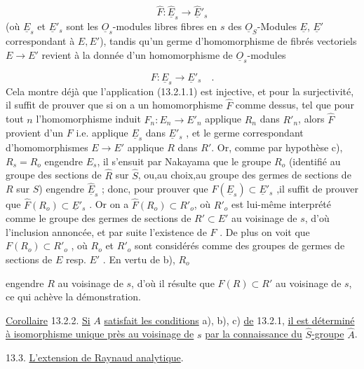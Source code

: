\begin{equation*}
\hat{F} : \hat{\underline{E}}_s \longrightarrow \hat{\underline{E}}'_s
\end{equation*}
(où $\underline{E}_s$ et $\underline{E}'_s$ sont les $\underline{O}_s$-modules libres fibres en $s$ des $\underline{O}_S$-Modules $\underline{E}$, $\underline{E}'$ correspondant à $E,E'$), tandis qu'un germe d'homomorphisme de fibrés vectoriels $E \longrightarrow E'$ revient à la donnée d'un homomorphisme de $\underline{O}_s$-modules

\begin{equation*}
F : \underline{E}_s \longrightarrow \underline{E}'_s \quad .
\end{equation*}
Cela montre déjà que l'application (13.2.1.1) est injective, et pour la surjectivité, il suffit de prouver que si on a un homomorphisme $\hat{F}$ comme dessus, tel que pour tout $n$ l'homomorphisme induit $F_n : E_n \longrightarrow E'_n$ applique $R_n$ dans $R'_n$, alors $\hat{F}$ provient d'un $F$ i.e. applique $\underline{E}_s$ dans $\underline{E}'_s$ , et le germe correspondant d'homomorphismes $E \longrightarrow E'$ applique $R$ dans $R'$. Or, comme par hypothèse c), $R_s = R_o$ engendre $E_s$, il s'ensuit par Nakayama que le groupe $R_o$ (identifié au groupe des sections de $\hat{R}$ sur $\hat{S}$, ou,au choix,au groupe des germes de sections de $R$ sur $S$) engendre $\hat{\underline{E}}_s$ ; donc, pour prouver que $\hat{F}(\underline{E}_s) \subset \underline{E}'_s$ ,il suffit de prouver que $\hat{F}(R_o) \subset \underline{E}'_s$ . Or on a $\hat{F}(R_o) \subset R'_o$, où $R'_o$ est lui-même interprété comme le groupe des germes de sections de $R' \subset E'$ au voisinage de $s$, d'où l'inclusion annoncée, et par suite l'existence de $F$ . De plus on voit que $F(R_o) \subset R'_o$ , où $R_o$ et $R'_o$ sont considérés comme des groupes de germes de sections de $E$ resp. $E'$ . En vertu de b), $R_o$



engendre $R$ au voisinage de $s$, d'où il résulte que $F(R) \subset R'$ au voisinage de $s$, ce qui achève la démonstration.

\underline{Corollaire} 13.2.2. \underline{Si} $A$ \underline{satisfait les conditions} a), b), c) \underline{de} 13.2.1, \underline{il est déterminé à isomorphisme unique près au voisinage de} $s$ \underline{par la connaissance du} $\hat{S}$\underline{-groupe} $\hat{A}$.


13.3. \underline{L'extension de Raynaud analytique}.

